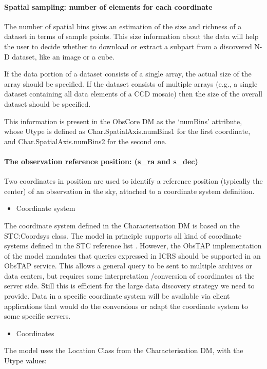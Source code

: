 \documentclass[11pt,a4paper]{ivoa}
\begin{document}
\paragraph[Spatial sampling: number of elements for each coordinate ]{Spatial sampling: number of elements for each
coordinate}
The number of spatial bins gives an estimation of the size and richness of a dataset in terms of sample points. This
size information about the data will help the user to decide whether to download or extract a subpart from a discovered
N-D dataset, like an image or a cube.

If the data portion of a dataset consists of a single array, the actual size of the array should be specified.  If the
dataset consists of multiple arrays (e.g., a single dataset containing all data elements of a CCD mosaic) then the size
of the overall dataset should be specified.

This information is present in the ObsCore DM as the `numBins' attribute, whose Utype is defined as
Char.SpatialAxis.numBins1 for the first coordinate, and Char.SpatialAxis.numBins2 for the second one.

\paragraph{The observation reference position: (s\_ra and s\_dec)}
Two coordinates in position are used to identify a reference position (typically the center) of an observation in the
sky, attached to a coordinate system definition. 

\begin{itemize}
\item Coordinate system
\end{itemize}
The coordinate system defined in the Characterisation DM is based on the STC:Coordsys class.  The model in principle
supports all kind of coordinate systems defined in the STC reference list \cite{2009ivoa.rept.1030R}. However, the ObsTAP
implementation of the model mandates that queries expressed in ICRS should be supported in an ObsTAP service. This
allows a general query to be sent to multiple archives or data centers, but requires some interpretation /conversion of
coordinates at the server side. Still this is efficient for the large data discovery strategy we need to provide.  Data
in a specific coordinate system will be available via client applications that would do the conversions or adapt the
coordinate system to some specific servers.

\begin{itemize}
\item Coordinates
\end{itemize}
The model uses the Location Class from the Characterisation DM, with the Utype values:
\end{document}
